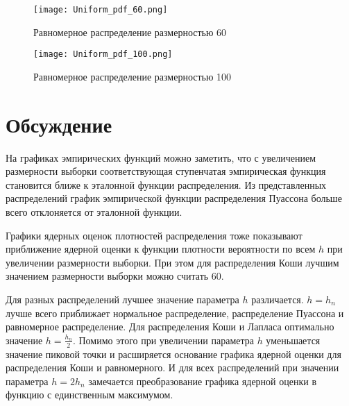 \documentclass[12pt,a4paper]{article}
\begin{document}
\begin{figure}[H]
    \centering
    \texttt{[image: Uniform\_pdf\_60.png]}
    \caption{Равномерное распределение размерностью 60}
\end{figure}

\begin{figure}[H]
    \centering
    \texttt{[image: Uniform\_pdf\_100.png]}
    \caption{Равномерное распределение размерностью 100}
\end{figure}

\section{Обсуждение}
На графиках эмпирических функций можно заметить, что с увеличением размерности выборки соответствующая ступенчатая эмпирическая функция становится ближе к эталонной функции распределения. Из представленных распределений график эмпирической функции распределения Пуассона больше всего отклоняется от эталонной функции.

Графики ядерных оценок плотностей распределения тоже показывают приближение ядерной оценки к функции плотности вероятности по всем $h$ при увеличении размерности выборки. При этом для распределения Коши лучшим значением размерности выборки можно считать 60.

Для разных распределений лучшее значение параметра $h$ различается. $h=h_n$ лучше всего приближает нормальное распределение, распределение Пуассона и равномерное распределение. Для распределения Коши и Лапласа оптимально значение $h=\frac{h_n}{2}$. Помимо этого при увеличении параметра $h$ уменьшается значение пиковой точки и расширяется основание графика ядерной оценки для распределения Коши и равномерного. И для всех распределений при значении параметра $h=2h_n$ замечается преобразование графика ядерной оценки в функцию с единственным максимумом.
\end{document}
